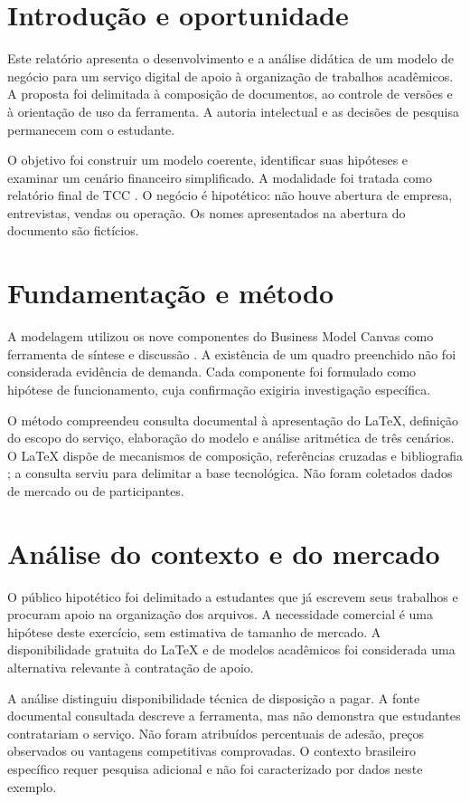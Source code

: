 \chapter{Introdução e oportunidade}
Este relatório apresenta o desenvolvimento e a análise didática de um modelo
de negócio para um serviço digital de apoio à organização de trabalhos
acadêmicos. A proposta foi delimitada à composição de documentos, ao controle
de versões e à orientação de uso da ferramenta. A autoria intelectual e as
decisões de pesquisa permanecem com o estudante.

O objetivo foi construir um modelo coerente, identificar suas hipóteses e
examinar um cenário financeiro simplificado. A modalidade foi tratada como
relatório final de TCC . O negócio é hipotético: não houve
abertura de empresa, entrevistas, vendas ou operação. Os nomes apresentados
na abertura do documento são fictícios.

\chapter{Fundamentação e método}
A modelagem utilizou os nove componentes do Business Model Canvas como
ferramenta de síntese e discussão . A existência de um
quadro preenchido não foi considerada evidência de demanda. Cada componente
foi formulado como hipótese de funcionamento, cuja confirmação exigiria
investigação específica.

O método compreendeu consulta documental à apresentação do LaTeX, definição
do escopo do serviço, elaboração do modelo e análise aritmética de três
cenários. O LaTeX dispõe de mecanismos de composição, referências cruzadas
e bibliografia ; a consulta serviu para delimitar a
base tecnológica. Não foram coletados dados de mercado ou de participantes.

\chapter{Análise do contexto e do mercado}
O público hipotético foi delimitado a estudantes que já escrevem seus
trabalhos e procuram apoio na organização dos arquivos. A necessidade
comercial é uma hipótese deste exercício, sem estimativa de tamanho de
mercado. A disponibilidade gratuita do LaTeX e de modelos acadêmicos foi
considerada uma alternativa relevante à contratação de apoio.

A análise distinguiu disponibilidade técnica de disposição a pagar. A fonte
documental consultada descreve a ferramenta, mas não demonstra que estudantes
contratariam o serviço. Não foram atribuídos percentuais de adesão, preços
observados ou vantagens competitivas comprovadas. O contexto brasileiro
específico requer pesquisa adicional e não foi caracterizado por dados neste exemplo.

